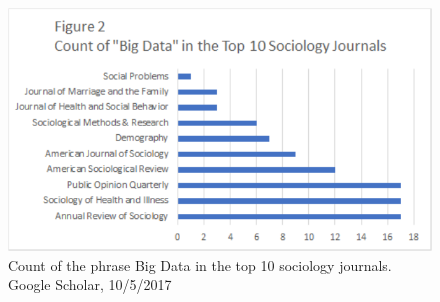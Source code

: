 \documentclass[sigconf]{acmart}
\begin{document}
\begin{figure}
\includegraphics[width=\columnwidth]{images/figure2}
\caption{Count of the phrase Big Data in the top 10 sociology journals.  Google Scholar, 10/5/2017}
\label{f:figure1}
\end{figure}



 
\end{document}
